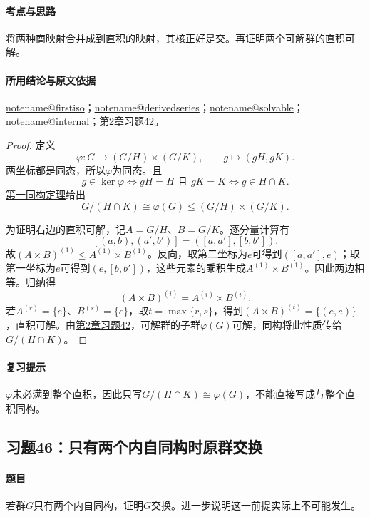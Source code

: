 \documentclass[UTF8,a4paper,11pt,fontset=windows]{ctexart}
\makeatletter
\newcommand{\noteref}[1]{\hyperref[note:#1]{\csname notename@#1\endcsname}}
\newcommand{\proofref}[2]{\hyperref[note:#1]{#2}}
\newcommand{\exref}[2]{\hyperref[ex:#1:#2]{第#1章习题#2}}
\makeatother
\begin{document}
\paragraph{考点与思路}
将两种商映射合并成到直积的映射，其核正好是交。再证明两个可解群的直积可解。

\paragraph{所用结论与原文依据}
\noteref{firstiso}；\noteref{derivedseries}；\noteref{solvable}；\noteref{internal}；\exref{2}{42}。


\begin{proof}
定义
\[
\varphi:G\longrightarrow(G/H)\times(G/K),
\qquad g\longmapsto(gH,gK).
\]
两坐标都是同态，所以$\varphi$为同态。且
\[
g\in\ker\varphi\iff gH=H\text{ 且 }gK=K
\iff g\in H\cap K.
\]
\proofref{firstiso}{第一同构定理}给出
\[
G/(H\cap K)\cong\varphi(G)\le(G/H)\times(G/K).
\]

为证明右边的直积可解，记$A=G/H$、$B=G/K$。逐分量计算有
\[
[(a,b),(a',b')]=([a,a'],[b,b']).
\]
故$(A\times B)^{(1)}\le A^{(1)}\times B^{(1)}$。反向，取第二坐标为$e$可得到$([a,a'],e)$；取第一坐标为$e$可得到$(e,[b,b'])$，这些元素的乘积生成$A^{(1)}\times B^{(1)}$。因此两边相等。归纳得
\[
(A\times B)^{(i)}=A^{(i)}\times B^{(i)}.
\]
若$A^{(r)}=\{e\}$、$B^{(s)}=\{e\}$，取$t=\max\{r,s\}$，得到$(A\times B)^{(t)}=\{(e,e)\}$，直积可解。由\exref{2}{42}，可解群的子群$\varphi(G)$可解，同构将此性质传给$G/(H\cap K)$。
\end{proof}

\paragraph{复习提示}
$\varphi$未必满到整个直积，因此只写$G/(H\cap K)\cong\varphi(G)$，不能直接写成与整个直积同构。


\subsection{习题46：\texorpdfstring{只有两个内自同构时原群交换}{只有两个内自同构时原群交换}}
\label{ex:2:46}

\paragraph{题目}
若群$G$只有两个内自同构，证明$G$交换。进一步说明这一前提实际上不可能发生。
\end{document}
